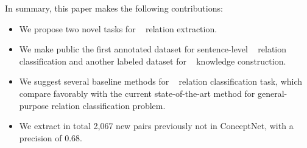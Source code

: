 In summary, this paper makes the following contributions: 
\begin{itemize}
	\item We propose two novel tasks for \lnear~ relation extraction.
	
	\item We make public the first annotated dataset for 
	sentence-level \lnear~ relation classification and another labeled dataset for
	\lnear~ knowledge construction. 
	
	\item We suggest several baseline methods for \lnear~ relation 
	classification task, 
	which compare favorably with the current state-of-the-art
	method for general-purpose relation classification problem. 
	
	\item We extract in total 2,067 new pairs previously not in
	ConceptNet, with a precision of 0.68.
\end{itemize}

